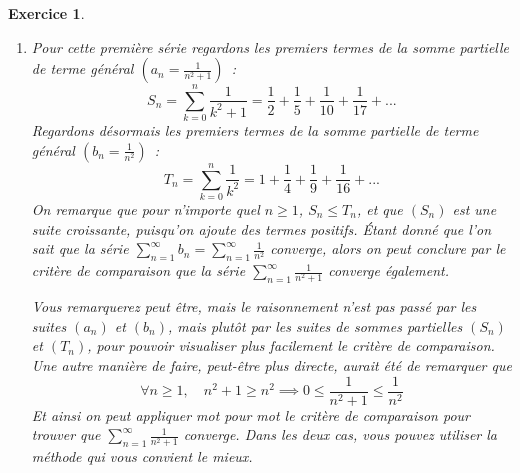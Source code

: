 \documentclass[11.5pt,french,table]{article}
\newcommand{\enumeratelinefix}{\leavevmode \vspace{-\baselineskip}} %
\theoremstyle{exercice}
\newtheorem{exercice}{Exercice}
\begin{document}
\begin{exercice}
\enumeratelinefix
\begin{enumerate}
    \item Pour cette première série regardons les premiers termes de la somme partielle de terme général $(a_n = \frac{1}{n^2 + 1})$~:
    \[
    S_n = \sum_{k = 0}^{n} \frac{1}{k^2 + 1} = \frac{1}{2} + \frac{1}{5} + \frac{1}{10} + \frac{1}{17} + ... 
    \]
    Regardons désormais les premiers termes de la somme partielle de terme général $(b_n = \frac{1}{n^2})$~:
    \[
    T_n = \sum_{k = 0}^{n} \frac{1}{k^2} = 1 + \frac{1}{4} + \frac{1}{9} + \frac{1}{16} + ... 
    \]
    On remarque que pour n'importe quel $n \geq 1$, $S_n \leq T_n$, et que $(S_n)$ est une suite croissante, puisqu'on ajoute des termes positifs. Étant donné que l'on sait que la série $\displaystyle\sum_{n = 1}^{\infty} b_n = \sum_{n=1}^\infty \frac{1}{n^2}$ converge, alors on peut conclure par le critère de comparaison que la série $\displaystyle\sum_{n=1}^\infty \frac{1}{n^2 + 1}$ converge également.
 
    Vous remarquerez peut être, mais le raisonnement n'est pas passé par les suites $(a_n)$ et $(b_n)$, mais plutôt par les suites de sommes partielles $(S_n)$ et $(T_n)$, pour pouvoir visualiser plus facilement le critère de comparaison. Une autre manière de faire, peut-être plus directe, aurait été de remarquer que
    \[
    \forall n \geq 1, \quad n^2 + 1 \geq n^2 \implies 0 \leq \frac{1}{n^2 + 1} \leq \frac{1}{n^2}
    \]
    Et ainsi on peut appliquer mot pour mot le critère de comparaison pour trouver que $\displaystyle\sum_{n = 1}^{\infty} \frac{1}{n^2 + 1}$ converge. Dans les deux cas, vous pouvez utiliser la méthode qui vous convient le mieux.
    

\end{enumerate}
\end{exercice}
\end{document}
